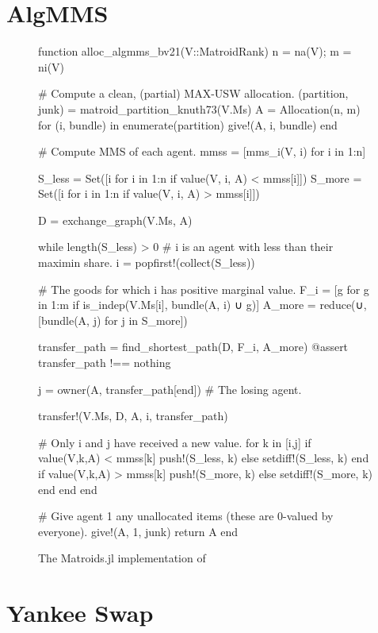 \section{AlgMMS}
\begin{figure}[ht!]
\begin{jllisting}
function alloc_algmms_bv21(V::MatroidRank)
  n = na(V); m = ni(V)

  # Compute a clean, (partial) MAX-USW allocation.
  (partition, junk) = matroid_partition_knuth73(V.Ms)
  A = Allocation(n, m)
  for (i, bundle) in enumerate(partition)
    give!(A, i, bundle)
  end

  # Compute MMS of each agent.
  mmss = [mms_i(V, i) for i in 1:n]

  S_less = Set([i for i in 1:n if value(V, i, A) < mmss[i]])
  S_more = Set([i for i in 1:n if value(V, i, A) > mmss[i]])

  D = exchange_graph(V.Ms, A)

  while length(S_less) > 0
    # i is an agent with less than their maximin share.
    i = popfirst!(collect(S_less))

    # The goods for which i has positive marginal value.
    F_i = [g for g in 1:m if is_indep(V.Ms[i], bundle(A, i) ∪ g)]
    A_more = reduce(∪, [bundle(A, j) for j in S_more])

    transfer_path = find_shortest_path(D, F_i, A_more)
    @assert transfer_path !== nothing

    j = owner(A, transfer_path[end]) # The losing agent.
    
    transfer!(V.Ms, D, A, i, transfer_path)

    # Only i and j have received a new value.
    for k in [i,j]
      if value(V,k,A) < mmss[k] push!(S_less, k) else setdiff!(S_less, k) end
      if value(V,k,A) > mmss[k] push!(S_more, k) else setdiff!(S_more, k) end
    end
  end

  # Give agent 1 any unallocated items (these are 0-valued by everyone).
  give!(A, 1, junk)
  return A
end
\end{jllisting}
\caption{The Matroids.jl implementation of }
\label{code:AlgMMS}
\end{figure}

\section{Yankee Swap}

